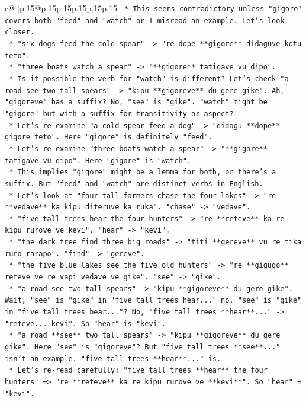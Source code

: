 \documentclass{article}
\begin{document}
{\begin{supertabular}{c@{$\;$}|p{.15\linewidth}@{}p{.15\linewidth}p{.15\linewidth}p{.15\linewidth}p{.15\linewidth}p{.15\linewidth}}
{{{\texttt{        *   This seems contradictory unless "gigore" covers both "feed" and "watch" or I misread an example. Let's look closer.} \\
\texttt{        *   "six dogs feed the cold spear" {-}> "re dope **gigore** didaguve kotu teto".} \\
\texttt{        *   "three boats watch a spear" {-}> "**gigore** tatigave vu dipo".} \\
\texttt{        *   Is it possible the verb for "watch" is different? Let's check "a road see two tall spears" {-}> "kipu **gigoreve** du gere gike". Ah, "gigoreve" has a suffix? No, "see" is "gike". "watch" might be "gigore" but with a suffix for transitivity or aspect?} \\
\texttt{        *   Let's re{-}examine "a cold spear feed a dog" {-}> "didagu **dope** gigore teto". Here "gigore" is definitely "feed".} \\
\texttt{        *   Let's re{-}examine "three boats watch a spear" {-}> "**gigore** tatigave vu dipo". Here "gigore" is "watch".} \\
\texttt{        *   This implies "gigore" might be a lemma for both, or there's a suffix. But "feed" and "watch" are distinct verbs in English.} \\
\texttt{        *   Let's look at "four tall farmers chase the four lakes" {-}> "re **vedave** ka kipu diteruve ka ruka". "chase" {-}> "vedave".} \\
\texttt{        *   "five tall trees hear the four hunters" {-}> "re **reteve** ka re kipu rurove ve kevi". "hear" {-}> "kevi".} \\
\texttt{        *   "the dark tree find three big roads" {-}> "titi **gereve** vu re tika ruro rarapo". "find" {-}> "gereve".} \\
\texttt{        *   "the five blue lakes see the five old hunters" {-}> "re **gigugo** reteve ve re vapi vedave ve gike". "see" {-}> "gike".} \\
\texttt{        *   "a road see two tall spears" {-}> "kipu **gigoreve** du gere gike". Wait, "see" is "gike" in "five tall trees hear..." no, "see" is "gike" in "five tall trees hear..."? No, "five tall trees **hear**..." {-}> "reteve... kevi". So "hear" is "kevi".} \\
\texttt{        *   "a road **see** two tall spears" {-}> "kipu **gigoreve** du gere gike". Here "see" is "gigoreve"? But "five tall trees **see**..." isn't an example. "five tall trees **hear**..." is.} \\
\texttt{        *   Let's re{-}read carefully: "five tall trees **hear** the four hunters" => "re **reteve** ka re kipu rurove ve **kevi**". So "hear" = "kevi".} \\
}}}
\end{supertabular}}
\end{document}

